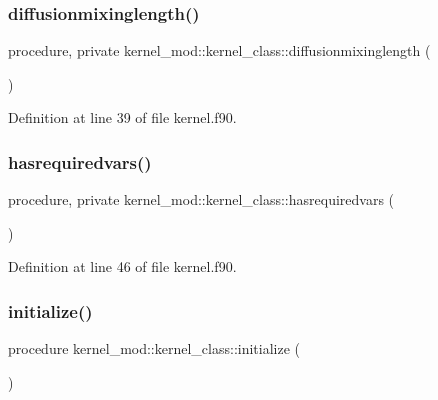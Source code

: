 \subsubsection{\texorpdfstring{diffusionmixinglength()}{diffusionmixinglength()}}
{\footnotesize\ttfamily procedure, private kernel\+\_\+mod\+::kernel\+\_\+class\+::diffusionmixinglength (\begin{DoxyParamCaption}{ }\end{DoxyParamCaption})\hspace{0.3cm}{\ttfamily [private]}}



Definition at line 39 of file kernel.\+f90.

\mbox{\label{structkernel__mod_1_1kernel__class_ae32f72181313bee935a0ded1885c3602}} 
\subsubsection{\texorpdfstring{hasrequiredvars()}{hasrequiredvars()}}
{\footnotesize\ttfamily procedure, private kernel\+\_\+mod\+::kernel\+\_\+class\+::hasrequiredvars (\begin{DoxyParamCaption}{ }\end{DoxyParamCaption})\hspace{0.3cm}{\ttfamily [private]}}



Definition at line 46 of file kernel.\+f90.

\mbox{\label{structkernel__mod_1_1kernel__class_a86a1de717f53f3276df28443b4495cc7}} 
\subsubsection{\texorpdfstring{initialize()}{initialize()}}
{\footnotesize\ttfamily procedure kernel\+\_\+mod\+::kernel\+\_\+class\+::initialize (\begin{DoxyParamCaption}{ }\end{DoxyParamCaption})}



